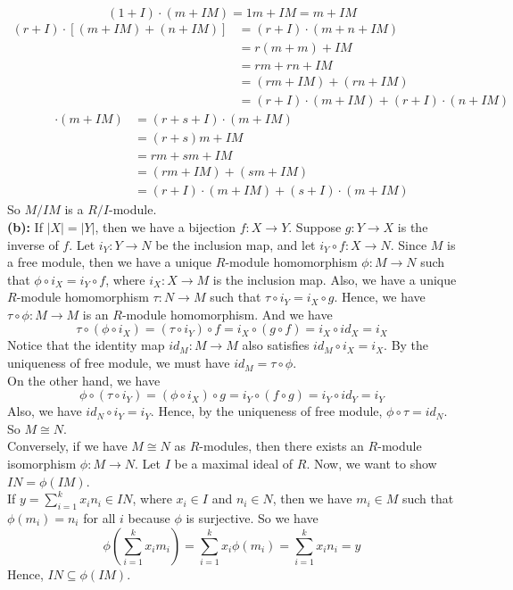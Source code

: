 \documentclass[12pt]{amsart}
\begin{document}
\[(1+I)\cdot(m+IM)=1m+IM=m+IM\tag{Axiom 2}\]
\begin{align*}
    (r+I)\cdot [(m+IM)+(n+IM)]&=(r+ I)\cdot (m+n+IM)\\
    &=r(m+m)+IM\\
    &=rm+rn+IM\\
    &=(rm+IM)+(rn+IM)\\
    &=(r+I)\cdot (m+IM)+(r+I)\cdot (n+IM)
\tag{Axiom 3}\end{align*}
\begin{align*}
    [(r+I)+(s+I)]\cdot (m+IM)&=(r+s+ I)\cdot (m+IM)\\
    &=(r+s)m+IM\\
    &=rm+sm+IM\\
    &=(rm+IM)+(sm+IM)\\
    &=(r+I)\cdot (m+IM)+(s+I)\cdot (m+IM)
\tag{Axiom 4}\end{align*}
So $M/IM$ is a $R/I$-module.\\
\textbf{(b): }If $|X|=|Y|$, then we have a bijection $f:X\to Y$. Suppose $g:Y\to X$ is the inverse of $f$. Let $i_Y:Y\to N$ be the inclusion map, and let $i_Y\circ f:X\to N$. Since $M$ is a free module, then we have a unique $R$-module homomorphism $\phi: M\to N$ such that $\phi\circ i_X=i_Y\circ f$, where $i_X:X\to M$ is the inclusion map. Also, we have a unique $R$-module homomorphism 
$\tau: N\to M$ such that $\tau\circ i_Y= i_X\circ g$. Hence, we have $\tau\circ \phi:M\to M$ is an $R$-module homomorphism. And we have 
\[\tau\circ( \phi\circ i_X)=(\tau\circ i_Y)\circ f=i_X\circ (g\circ f)=i_X\circ id_X=i_X\]
Notice that the identity map $id_M:M\to M$ also satisfies $ id_M\circ i_X=i_X$. By the uniqueness of free module, we must have $id_M=\tau\circ \phi$.\\
On the other hand, we have 
\[\phi\circ (\tau\circ i_Y)=(\phi\circ i_X)\circ g=i_Y\circ (f\circ g)=i_Y\circ id_Y=i_Y \]
Also, we have $id_N\circ i_Y=i_Y$. Hence, by the uniqueness of free module, $\phi\circ \tau=id_N$. So $M\cong N$.\\
Conversely, if we have $M\cong N$ as $R$-modules, then there exists an $R$-module isomorphism $\phi:M\to N$. Let $I$ be a maximal ideal of $R$. Now, we want to show $IN=\phi(IM)$.\\
If $y=\sum_{i=1}^kx_in_i\in IN$, where $x_i\in I$ and $n_i\in N$, then we have $m_i\in M$ such that $\phi(m_i)=n_i$ for all $i$ because $\phi$ is surjective. So we have 
\[\phi(\sum_{i=1}^kx_im_i)=\sum_{i=1}^kx_i\phi(m_i)=\sum_{i=1}^kx_in_i=y\]
Hence, $IN\subseteq \phi(IM)$.\\
\end{document}
